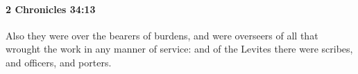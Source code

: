 
		\paragraph{2 Chronicles 34:13} %
			\label{2CHRONICLES-34-13}

			Also they were over the bearers of burdens, and were overseers of all that wrought the work in any manner of service: and of the Levites there were scribes, and officers, and porters.


